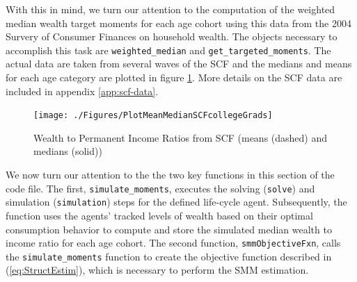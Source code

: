 \documentclass[titlepage, headings=optiontotocandhead]{econtex}
\begin{document}
With this in mind, we turn our attention to the computation
of the weighted median wealth target moments for each age cohort
using this data from the 2004 Survery of Consumer Finances on household
wealth. The objects necessary to accomplish this task are \texttt{weighted\_median} and
\texttt{get\_targeted\_moments}. The actual data are taken from several waves of the SCF and the medians
and means for each age category are plotted in figure \ref{fig:MeanMedianSCF}.
More details on the SCF data are included in appendix \ref{app:scf-data}.

\hypertarget{PlotMeanMedianSCFcollegeGrads}{}
\begin{figure}
  \texttt{[image: ./Figures/PlotMeanMedianSCFcollegeGrads]}
  \caption{Wealth to Permanent Income Ratios from SCF (means (dashed) and medians (solid))}
  \label{fig:MeanMedianSCF}
\end{figure}

We now turn our attention to the the two key functions in this section of the code file. The first, \texttt{simulate\_moments}, executes the solving (\texttt{solve}) and simulation (\texttt{simulation}) steps for the defined life-cycle agent.  Subsequently, the function uses the agents' tracked levels of wealth based on their optimal consumption behavior to compute and store the simulated median wealth to income ratio for each age cohort. The second function, \texttt{smmObjectiveFxn}, calls the \texttt{simulate\_moments} function to create the objective function described in (\ref{eq:StructEstim}), which is necessary to perform the SMM estimation.


\end{document}
